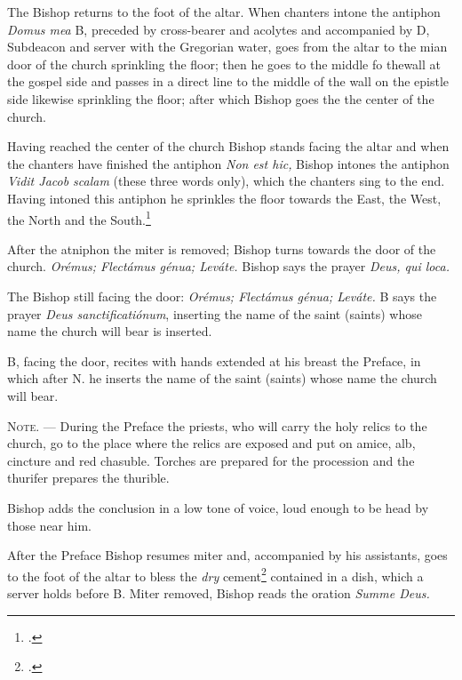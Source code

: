 \documentclass[letterpaper]{report}
\begin{document}
{\rubric The Bishop returns to the foot of the altar. When chanters intone the antiphon
\textit{Domus mea} B, preceded by cross-bearer and acolytes and accompanied by D, Subdeacon and
server with the Gregorian water, goes from the altar to the mian door of the
church sprinkling the floor; then he goes to the middle fo thewall at the
gospel side and passes in a direct line to the middle of the wall on the
epistle side likewise sprinkling the floor; after which Bishop goes the the center
of the church.

\rubric Having reached the center of the church Bishop stands facing the altar and
when the chanters have finished the antiphon \textit{Non est hic,} Bishop intones
the antiphon \textit{Vidit Jacob scalam} (these three words only), which the
chanters sing to the end. Having intoned this antiphon he sprinkles the floor
towards the East, the West, the North and the South.\footcite[The Rubric in the
\textit{Pontificale Romanum} supposes the altar to be towards the East; the
bishop, therefore, sprinkles the floor before him, behind him, at his left and
than at his right.][footnote 1, p. 74.]{consecranda}

\rubric After the atniphon the miter is removed; Bishop turns towards the door of
the church. \textit{Orémus; Flectámus génua; Leváte.} Bishop says the prayer
\textit{Deus, qui loca.}

\rubric The Bishop still facing the door: \textit{Orémus; Flectámus génua; Leváte.} B
says the prayer \textit{Deus sanctificatiónum}, inserting the name of the saint
(saints) whose name the church will bear is inserted.

\rubric B, facing the door, recites with hands extended at his breast the
Preface, in which after N. he inserts the name of the saint (saints) whose name
the church will bear.

\textsc{Note. ---} During the Preface the priests, who will carry the holy
relics to the church, go to the place where the relics are exposed and put on
amice, alb, cincture and red chasuble. Torches are prepared for the procession
and the thurifer prepares the thurible.

Bishop adds the conclusion in a low tone of voice, loud enough to be head by those
near him.

\rubric After the Preface Bishop resumes miter and, accompanied by his assistants,
goes to the foot of the altar to bless the \textit{dry} cement\footcite[The
Pontifical prescrives that he should first mix the cement with the water which
he previously blessed and then bless the mixture. This is not feasible and
consequently it is better to keep sufficient amount of water in a separate
vessel to be poured over the dry cement shortly before it is to be used for
closing the sepulchre.][footnote, p. 77.]{consecranda} contained in a dish,
which a server holds before B. Miter removed, Bishop reads the oration \textit{Summe
Deus.}

}
\end{document}
